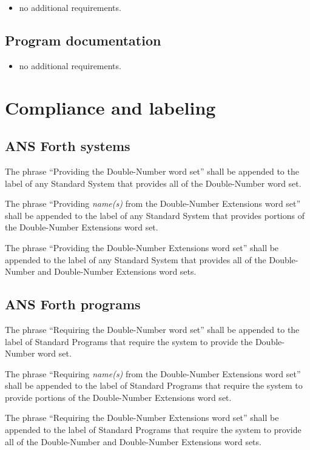 \begin{itemize}
\item no additional requirements.
\end{itemize}

\subsection{Program documentation} %

\begin{itemize}
\item no additional requirements.
\end{itemize}


\section{Compliance and labeling} %

\subsection{ANS Forth systems} %

The phrase ``Providing the Double-Number word set'' shall be
appended to the label of any Standard System that provides all
of the Double-Number word set.

The phrase ``Providing \emph{name(s)} from the Double-Number
Extensions word set'' shall be appended to the label of any
Standard System that provides portions of the Double-Number
Extensions word set.

The phrase ``Providing the Double-Number Extensions word set''
shall be appended to the label of any Standard System that
provides all of the Double-Number and Double-Number Extensions
word sets.

\subsection{ANS Forth programs} %

The phrase ``Requiring the Double-Number word set'' shall be
appended to the label of Standard Programs that require the
system to provide the Double-Number word set.

The phrase ``Requiring \emph{name(s)} from the Double-Number
Extensions word set'' shall be appended to the label of Standard
Programs that require the system to provide portions of the
Double-Number Extensions word set.

The phrase ``Requiring the Double-Number Extensions word set''
shall be appended to the label of Standard Programs that require
the system to provide all of the Double-Number and Double-Number
Extensions word sets.

